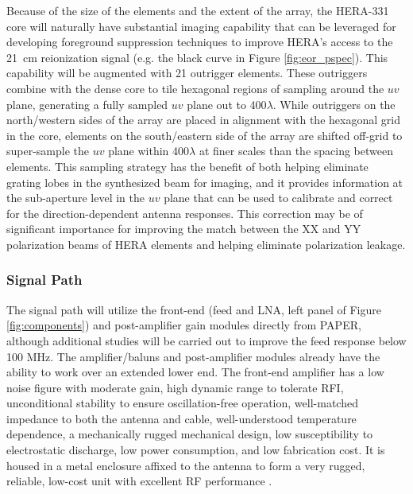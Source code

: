 \documentclass[preprint]{aastex}
\begin{document}
Because of the size of the elements and the extent of the array, the HERA-331 core will naturally have substantial
imaging capability that can be leveraged for developing foreground suppression techniques
to improve HERA's access to the 21~cm reionization signal (e.g. the black curve
in Figure \ref{fig:eor_pspec}).
This capability will be augmented with 21 outrigger elements.  These outriggers
combine with the dense core to tile hexagonal regions of sampling around the $uv$ plane, generating a fully
sampled $uv$ plane out to 400$\lambda$.  While outriggers on the north/western sides of the array are
placed in alignment with the hexagonal grid in the core, elements on the south/eastern side of the array are
shifted off-grid to super-sample the $uv$ plane within 400$\lambda$ at finer scales than the spacing
between elements.  This sampling strategy has the benefit of both helping eliminate grating lobes in the
synthesized beam for imaging, and it provides information at the sub-aperture level in the $uv$ plane that
can be used to calibrate and correct for the direction-dependent antenna responses.  This correction may
be of significant importance for improving the match between the XX and YY polarization beams of HERA elements
and helping eliminate polarization leakage.

\vspace{-0.25in}
\subsubsection{Signal Path}
\vspace{-6pt}
The signal path will utilize the front-end (feed and LNA, left panel of Figure \ref{fig:components})
and post-amplifier gain modules directly
from PAPER, although additional studies will be carried out to improve the feed
response below 100 MHz. The amplifier/baluns and post-amplifier modules already have
the ability to work over an extended lower end. The front-end amplifier has a low
noise figure with moderate gain, high dynamic range to tolerate RFI, unconditional
stability to ensure oscillation-free operation, well-matched impedance to both the
antenna and cable, well-understood temperature dependence, a mechanically rugged
mechanical design, low susceptibility to electrostatic discharge, low power
consumption, and low fabrication cost. It is housed in a metal enclosure affixed to
the antenna to form a very rugged, reliable, low-cost unit with excellent RF
performance \citep{parsons_et_al2010}.
\end{document}
